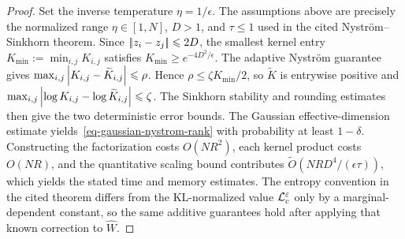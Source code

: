 \begin{proof}
Set the inverse temperature \(\eta=1/\epsilon\). The assumptions above are precisely the normalized range \(\eta\in[1,N]\), \(D>1\), and \(\tau\leq1\) used in the cited Nystr\"om--Sinkhorn theorem. Since \(|\!| z_i-z_j |\!|\leqslant2D\), the smallest kernel entry \(K_{\min}:=\min_{i,j}K_{i,j}\) satisfies \(K_{\min}\geq e^{-4D^2/\epsilon}\). The adaptive Nystr\"om guarantee gives \(\max_{i,j}\left\lvert K_{i,j}-\widetilde K_{i,j}\right\rvert\leqslant\rho\). Hence \(\rho\leq\zeta K_{\min}/2\), so \(\widetilde K\) is entrywise positive and \(\max_{i,j}\left\lvert\log K_{i,j}-\log\widetilde K_{i,j}\right\rvert\leqslant\zeta\). The Sinkhorn stability and rounding estimates then give the two deterministic error bounds. The Gaussian effective-dimension estimate yields~\eqref{eq-gaussian-nystrom-rank} with probability at least \(1-\delta\). Constructing the factorization costs \(O(NR^2)\), each kernel product costs \(O(NR)\), and the quantitative scaling bound contributes \(\widetilde O(NRD^4/(\epsilon\tau))\), which yields the stated time and memory estimates. The entropy convention in the cited theorem differs from the KL-normalized value \(\mathcal{L}_c^\varepsilon\) only by a marginal-dependent constant, so the same additive guarantees hold after applying that known correction to \(\widehat W\).
\end{proof}
